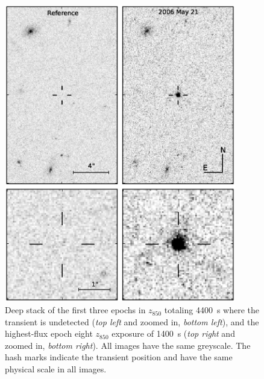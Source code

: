 \begin{figure}
\begin{center}
\includegraphics[width=0.9\textwidth]{figures/scp06f6/images.eps}
\end{center}
\caption[Imaging of SN SCP06F6]{Deep stack of the first three epochs
  in $z_{850}$ totaling 4400~s where the transient is undetected
  (\emph{top left} and zoomed in, \emph{bottom left}), and the
  highest-flux epoch eight $z_{850}$ exposure of 1400~s (\emph{top
    right} and zoomed in, \emph{bottom right}).  All images have the
  same greyscale.  The hash marks indicate the transient position and
  have the same physical scale in all images.\label{fig:images}}
\end{figure}

